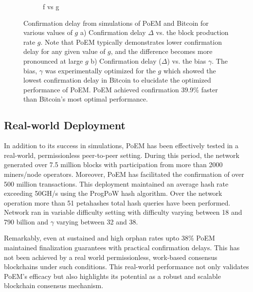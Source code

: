 \begin{figure}
\begin{subfigure}{0.49\textwidth}
    \caption{f vs g}
    \label{fig:fg}
    \end{subfigure}
    \caption{Confirmation delay from simulations of PoEM and Bitcoin for various values of $g$ a) Confirmation delay $\Delta$ vs. the block production rate $g$. Note that PoEM typically demonstrates lower confirmation delay for any given value of $g$, and the difference becomes more pronounced at large $g$ b) Confirmation delay ($\Delta$) vs. the bias $\gamma$. The bias, $\gamma$ was experimentally optimized for the $g$ which showed the lowest confirmation delay in Bitcoin to elucidate the optimized performance of PoEM. PoEM achieved confirmation 39.9\% faster than Bitcoin's most optimal performance.}
    \label{fig:gamma}
\end{figure}

\subsection{Real-world Deployment}
In addition to
its success in simulations, PoEM has been effectively tested in a real-world,
permissionless peer-to-peer setting. During this
period, the network generated over 7.5 million blocks with participation from
more than 2000 miners/node operators. Moreover, PoEM has facilitated the
confirmation of over 500 million transactions. This deployment maintained an
average hash rate exceeding 50GH/s using the ProgPoW hash algorithm. Over the
network operation more than 51 petahashes total hash queries have been performed.
Network ran in variable difficulty setting with difficulty varying between 18
and 790 billion and $\gamma$ varying between 32 and 38.

Remarkably, even at sustained and high orphan rates upto 38\% PoEM maintained
finalization guarantees with practical confirmation delays. This has not been
achieved by a real world permissionless, work-based consensus blockchains under
such conditions. This real-world performance not only validates PoEM's efficacy
but also highlights its potential as a robust and scalable blockchain consensus
mechanism.
